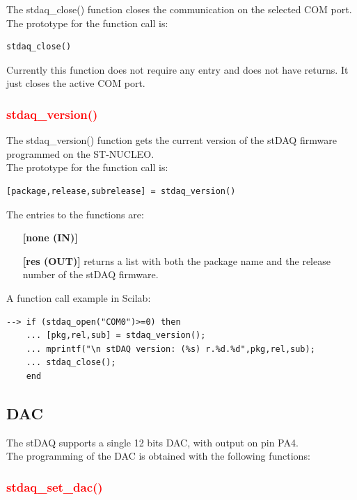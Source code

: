 \documentclass[letterpaper,10pt,english]{hitec}
\begin{document}
The stdaq\_close() function closes the communication on the selected COM port. \\
The prototype for the function call is:
\begin{verbatim}
stdaq_close()
\end{verbatim}
Currently this function does not require any entry and does not have returns. It just closes the active COM port.

\subsubsection{\textcolor{red}{stdaq\_version()}}

The stdaq\_version() function gets the current version of the stDAQ firmware programmed on the ST-NUCLEO. \\
The prototype for the function call is:
\begin{verbatim}
[package,release,subrelease] = stdaq_version()
\end{verbatim}
The entries to the functions are:
\begin{itemize}
\item [\textbf{[none (IN)]}] 
\item [\textbf{[res (OUT)]}] returns a list with both the package name and the release number of the stDAQ firmware.
\end{itemize}
A function call example in Scilab:
\begin{verbatim}
--> if (stdaq_open("COM0")>=0) then 
    ... [pkg,rel,sub] = stdaq_version();
    ... mprintf("\n stDAQ version: (%s) r.%d.%d",pkg,rel,sub);
    ... stdaq_close();
    end
\end{verbatim}

\hrulefill

\subsection{DAC}

The stDAQ supports a single 12 bits DAC, with output on pin PA4. \\
The programming of the DAC is obtained with the following functions:

\subsubsection{\textcolor{red}{stdaq\_set\_dac()}}
\end{document}
